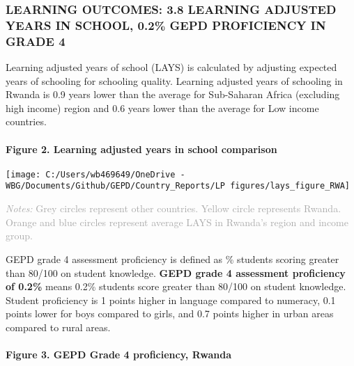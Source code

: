 \documentclass[twocolumn]{article}
\let\oldparagraph\paragraph
\renewcommand{\paragraph}[1]{\oldparagraph{#1}\mbox{}}
\begin{document}
\hypertarget{learning-outcomes-3.8-learning-adjusted-years-in-school-0.2-gepd-proficiency-in-grade-4}{%
\subsubsection{\texorpdfstring{\textbf{LEARNING OUTCOMES: 3.8 LEARNING
ADJUSTED YEARS IN SCHOOL, 0.2\% GEPD PROFICIENCY IN GRADE
4}}{LEARNING OUTCOMES: 3.8 LEARNING ADJUSTED YEARS IN SCHOOL, 0.2\% GEPD PROFICIENCY IN GRADE 4}}\label{learning-outcomes-3.8-learning-adjusted-years-in-school-0.2-gepd-proficiency-in-grade-4}}

Learning adjusted years of school (LAYS) is calculated by adjusting
expected years of schooling for schooling quality. Learning adjusted
years of schooling in Rwanda is 0.9 years lower than the average for
Sub-Saharan Africa (excluding high income) region and 0.6 years lower
than the average for Low income countries.

\hypertarget{figure-2.-learning-adjusted-years-in-school-comparison}{%
\paragraph{Figure 2. Learning adjusted years in school
comparison}\label{figure-2.-learning-adjusted-years-in-school-comparison}}

\texttt{[image: C:/Users/wb469649/OneDrive - WBG/Documents/Github/GEPD/Country\_Reports/LP figures/lays\_figure\_RWA]}

{\scriptsize
    \textcolor{darkgray}{\textit{Notes:} Grey circles represent other countries. Yellow circle represents Rwanda. Orange and blue circles represent average LAYS in Rwanda's region and income group.}
  }

GEPD grade 4 assessment proficiency is defined as \% students scoring
greater than 80/100 on student knowledge. \textbf{GEPD grade 4
assessment proficiency of 0.2\%} means 0.2\% students score greater than
80/100 on student knowledge. Student proficiency is 1 points higher in
language compared to numeracy, 0.1 points lower for boys compared to
girls, and 0.7 points higher in urban areas compared to rural areas.

\vfill\null

\hypertarget{figure-3.-gepd-grade-4-proficiency-rwanda}{%
\paragraph{Figure 3. GEPD Grade 4 proficiency,
Rwanda}\label{figure-3.-gepd-grade-4-proficiency-rwanda}}
\end{document}
